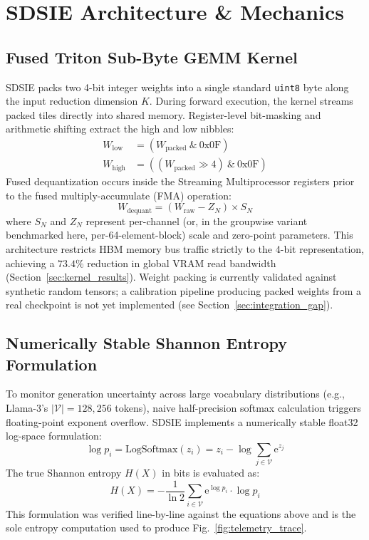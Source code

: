 \documentclass[10pt,journal,compsoc,twocolumn]{IEEEtran}
\begin{document}
\section{SDSIE Architecture \& Mechanics}

\subsection{Fused Triton Sub-Byte GEMM Kernel}
SDSIE packs two 4-bit integer weights into a single standard \texttt{uint8} byte along the input reduction dimension $K$. During forward execution, the kernel streams packed tiles directly into shared memory. Register-level bit-masking and arithmetic shifting extract the high and low nibbles:
\begin{align}
W_{\text{low}} &= (W_{\text{packed}} \ \& \ \text{0x0F}) \\
W_{\text{high}} &= ((W_{\text{packed}} \gg 4) \ \& \ \text{0x0F})
\end{align}
Fused dequantization occurs inside the Streaming Multiprocessor registers prior to the fused multiply-accumulate (FMA) operation:
\begin{equation}
W_{\text{dequant}} = (W_{\text{raw}} - Z_N) \times S_N
\end{equation}
where $S_N$ and $Z_N$ represent per-channel (or, in the groupwise variant benchmarked here, per-64-element-block) scale and zero-point parameters. This architecture restricts HBM memory bus traffic strictly to the 4-bit representation, achieving a $73.4\%$ reduction in global VRAM read bandwidth (Section~\ref{sec:kernel_results}). Weight packing is currently validated against synthetic random tensors; a calibration pipeline producing packed weights from a real checkpoint is not yet implemented (see Section~\ref{sec:integration_gap}).

\subsection{Numerically Stable Shannon Entropy Formulation}
To monitor generation uncertainty across large vocabulary distributions (e.g., Llama-3's $|\mathcal{V}| = 128,256$ tokens), naive half-precision softmax calculation triggers floating-point exponent overflow. SDSIE implements a numerically stable float32 log-space formulation:
\begin{equation}
\log p_i = \text{LogSoftmax}(z_i) = z_i - \log \sum_{j \in \mathcal{V}} \mathrm{e}^{z_j}
\end{equation}
The true Shannon entropy $H(X)$ in bits is evaluated as:
\begin{equation}
H(X) = - \frac{1}{\ln 2} \sum_{i \in \mathcal{V}} \mathrm{e}^{\log p_i} \cdot \log p_i
\end{equation}
This formulation was verified line-by-line against the equations above and is the sole entropy computation used to produce Fig.~\ref{fig:telemetry_trace}.
\end{document}
